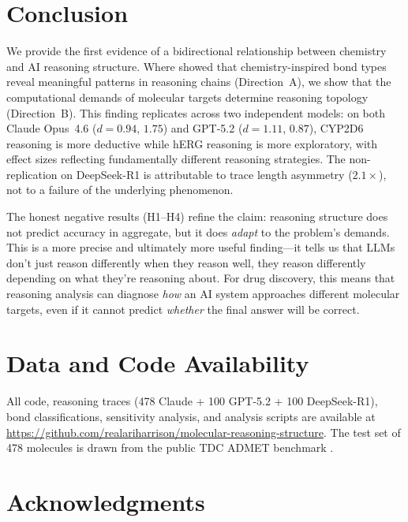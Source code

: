 \documentclass[11pt]{article}
\begin{document}
\section{Conclusion}
\label{sec:conclusion}

We provide the first evidence of a bidirectional relationship between chemistry and AI reasoning structure. Where \citet{chen2026molecular} showed that chemistry-inspired bond types reveal meaningful patterns in reasoning chains (Direction~A), we show that the computational demands of molecular targets determine reasoning topology (Direction~B). This finding replicates across two independent models: on both Claude Opus~4.6 ($d = 0.94$, $1.75$) and GPT-5.2 ($d = 1.11$, $0.87$), CYP2D6 reasoning is more deductive while hERG reasoning is more exploratory, with effect sizes reflecting fundamentally different reasoning strategies. The non-replication on DeepSeek-R1 is attributable to trace length asymmetry ($2.1\times$), not to a failure of the underlying phenomenon.

The honest negative results (H1--H4) refine the claim: reasoning structure does not predict accuracy in aggregate, but it does \emph{adapt} to the problem's demands. This is a more precise and ultimately more useful finding---it tells us that LLMs don't just reason differently when they reason well, they reason differently depending on what they're reasoning about. For drug discovery, this means that reasoning analysis can diagnose \emph{how} an AI system approaches different molecular targets, even if it cannot predict \emph{whether} the final answer will be correct.

\section*{Data and Code Availability}

All code, reasoning traces (478 Claude + 100 GPT-5.2 + 100 DeepSeek-R1), bond classifications, sensitivity analysis, and analysis scripts are available at \url{https://github.com/realariharrison/molecular-reasoning-structure}. The test set of 478 molecules is drawn from the public TDC ADMET benchmark \citep{huang2021therapeutics}.

\section*{Acknowledgments}
\end{document}
